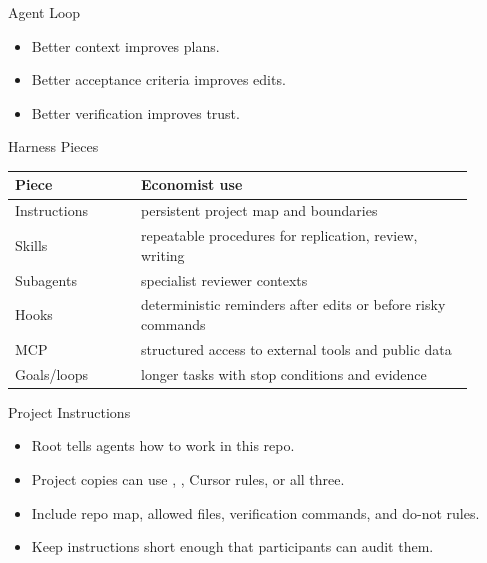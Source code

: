 \begin{frame}{Agent Loop}
  \begin{center}
  \end{center}
  \begin{itemize}
    \item Better context improves plans.
    \item Better acceptance criteria improves edits.
    \item Better verification improves trust.
  \end{itemize}
\end{frame}

\begin{frame}{Harness Pieces}
  \begin{tabular}{p{0.25\linewidth}p{0.66\linewidth}}
    \toprule
    Piece & Economist use \\
    \midrule
    Instructions & persistent project map and boundaries \\
    Skills & repeatable procedures for replication, review, writing \\
    Subagents & specialist reviewer contexts \\
    Hooks & deterministic reminders after edits or before risky commands \\
    MCP & structured access to external tools and public data \\
    Goals/loops & longer tasks with stop conditions and evidence \\
    \bottomrule
  \end{tabular}
\end{frame}

\begin{frame}{Project Instructions}
  \begin{itemize}
    \item Root  tells agents how to work in this repo.
    \item Project copies can use , , Cursor rules, or all three.
    \item Include repo map, allowed files, verification commands, and do-not rules.
    \item Keep instructions short enough that participants can audit them.
  \end{itemize}
\end{frame}

